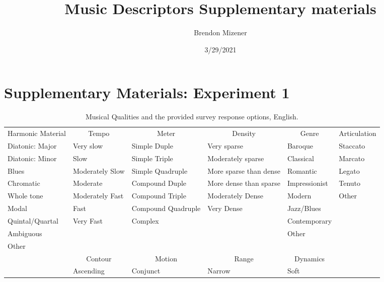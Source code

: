 \documentclass[
]{article}
\title{Music Descriptors Supplementary materials}
\author{Brendon Mizener}
\date{3/29/2021}
\makeatletter
\newenvironment{lltable}{\begin{landscape}\begin{center}\begin{ThreePartTable}}{\end{ThreePartTable}\end{center}\end{landscape}}
\newcommand\LastLTentrywidth{1em}
\newlength\longtablewidth
\newcommand{\getlongtablewidth}{\begingroup \ifcsname LT@\roman{LT@tables}\endcsname \global\longtablewidth=0pt \renewcommand{\LT@entry}[2]{\global\advance\longtablewidth by ##2\relax\gdef\LastLTentrywidth{##2}}\@nameuse{LT@\roman{LT@tables}} \fi \endgroup}
\makeatother
\begin{document}
\maketitle

\hypertarget{supplementary-materials-experiment-1}{%
\section{Supplementary Materials: Experiment
1}\label{supplementary-materials-experiment-1}}

\begin{lltable}
\begin{footnotesize}
\begin{longtable}{p{}p{}p{}p{}p{}p{}}\noalign{\getlongtablewidth\global\LTcapwidth=\longtablewidth}
\caption{\label{tab:qualitiestable}Musical Qualities and the provided survey response options, English.}\\
\toprule[.8pt]
 \multicolumn{1}{c}{Harmonic Material} & \multicolumn{1}{c}{Tempo} & \multicolumn{1}{c}{Meter} & \multicolumn{1}{c}{Density} & \multicolumn{1}{c}{Genre} & \multicolumn{1}{c}{Articulation}\\
 \midrule
      Diatonic: Major & Very slow & Simple Duple & Very sparse & Baroque & Staccato \\
      Diatonic: Minor & Slow & Simple Triple & Moderately sparse & Classical & Marcato \\
      Blues & Moderately Slow & Simple Quadruple  & More sparse than dense & Romantic & Legato\\
      Chromatic & Moderate & Compound Duple & More dense than sparse & Impressionist & Tenuto\\
      Whole tone & Moderately Fast & Compound Triple & Moderately Dense & Modern & Other \\       
      Modal  & Fast & Compound Quadruple & Very Dense & Jazz/Blues & \\
      Quintal/Quartal  & Very Fast & Complex & & Contemporary & \\
      Ambiguous  & & & & Other & \\
      Other  & & & & & \\
\bottomrule\addlinespace[.5em]
 & \multicolumn{1}{c}{Contour} & \multicolumn{1}{c}{Motion} & \multicolumn{1}{c}{Range} & \multicolumn{1}{c}{Dynamics} & \\
 \cmidrule[.5pt]{2-5}
  & Ascending & Conjunct & Narrow & Soft & \\

\end{longtable}
\end{footnotesize}
\end{lltable}
\end{document}
